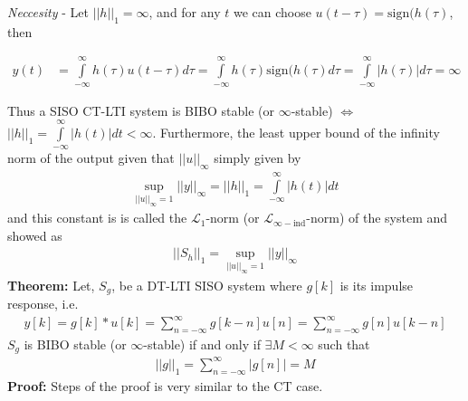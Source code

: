 \documentclass[twoside]{article}
\begin{document}
\textit{Neccesity} - Let $ || h ||_1 = \infty $, and for any $t$ we can choose $u(t - \tau) = \mathrm{sign}( h( \tau )$, then

\begin{align*}
	y(t) &= \int\limits_{-\infty}^{\infty} h(\tau) u(t - \tau) d\tau = 
	\int\limits_{-\infty}^{\infty} h(\tau) \mathrm{sign}( h( \tau ) d\tau = 
	\int\limits_{-\infty}^{\infty} | h(\tau) |  d\tau = \infty
\end{align*}

Thus a SISO CT-LTI system is  BIBO stable (or $\infty$-stable) $\iff$ $|| h ||_{1} = \int\limits_{-\infty}^{\infty} | h(t) | dt < \infty$.
Furthermore, the least upper bound of the infinity norm of the output given that $ || u ||_{\infty}$ simply given by 
%
\begin{align*}
	\underset{|| u ||_{\infty} = 1}{\sup} || y ||_{\infty} = || h ||_{1} = \int\limits_{-\infty}^{\infty} | h(t) | dt
\end{align*}
%
and this constant is is called the $\mathcal{L}_1$-norm (or $\mathcal{L}_{\infty-\mathrm{ind}}$-norm) of the system and showed as
%
\begin{align*}
	|| S_h ||_1 =  \underset{|| u ||_{\infty} = 1}{\sup} || y ||_{\infty} 
\end{align*}
%
\textbf{Theorem:} Let, $S_{g}$, be a DT-LTI SISO system where $g[k]$ is its impulse response, i.e.
%
\begin{align*}
y[k] = g[k] * u[k] = \sum\limits_{n=-\infty}^{\infty} g[k - n] u[n]  =  \sum\limits_{n=-\infty}^{\infty} g[n] u[k - n]  
\end{align*}
%
$S_{g}$ is BIBO stable (or $\infty$-stable) if and only if $\exists M < \infty$ such that 
%
\begin{align*}
	|| g ||_1 =  \sum\limits_{n=-\infty}^{\infty} | g[n] | = M
\end{align*}
%
\textbf{Proof:} Steps of the proof is very similar to the CT case. 

\end{document}
